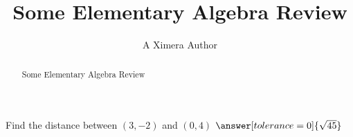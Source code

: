 \documentclass{ximera}
\title{Some Elementary Algebra Review}
\author{A Ximera Author}
\begin{document}
\begin{abstract}
Some Elementary Algebra Review
\end{abstract}

\maketitle

\begin{problem}
   Find the distance between $(3, -2)$ and $(0, 4)$ $\answer[tolerance=0]{\sqrt{45}}$
\end{problem}
\end{document}
